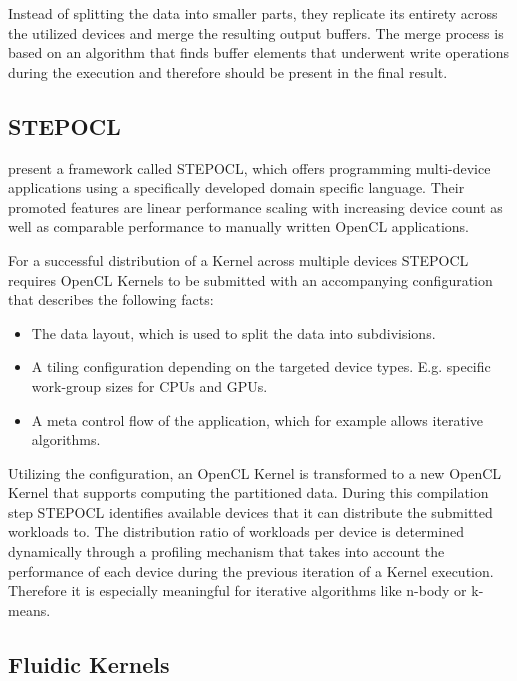 Instead of splitting the data into smaller parts, they replicate its entirety across the utilized devices and merge the resulting output buffers. The merge process is based on an algorithm that finds buffer elements that underwent write operations during the execution and therefore should be present in the final result.


\subsection*{STEPOCL}

\citeauthor{stepocl} present a framework called STEPOCL, which offers programming multi-device applications using a specifically developed domain specific language\cite{stepocl}. Their promoted features are linear performance scaling with increasing device count as well as comparable performance to manually written OpenCL applications.

For a successful distribution of a Kernel across multiple devices STEPOCL requires OpenCL Kernels to be submitted with an accompanying configuration that describes the following facts:
\begin{itemize}
    \item The data layout, which is used to split the data into subdivisions.
    \item A tiling configuration depending on the targeted device types. E.g. specific work-group sizes for CPUs and GPUs.
    \item A meta control flow of the application, which for example allows iterative algorithms.
\end{itemize}

Utilizing the configuration, an OpenCL Kernel is transformed to a new OpenCL Kernel that supports computing the partitioned data. During this compilation step STEPOCL identifies available devices that it can distribute the submitted workloads to. The distribution ratio of workloads per device is determined dynamically through a profiling mechanism that takes into account the performance of each device during the previous iteration of a Kernel execution. Therefore it is especially meaningful for iterative algorithms like n-body or k-means.

\subsection*{Fluidic Kernels}

